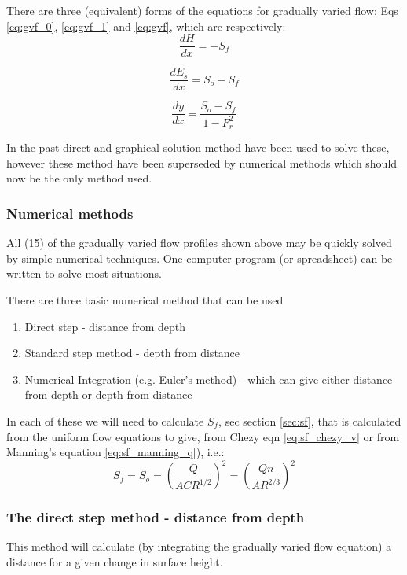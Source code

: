 \documentclass[a4paper, 12pt, british]{article} %
\numberwithin{equation}{section}
\numberwithin{figure}{section}
\numberwithin{table}{section}
\begin{document}
There are three (equivalent) forms of the equations for gradually varied flow: Eqs \ref{eq:gvf_0}, \ref{eq:gvf_1} and \ref{eq:gvf}, which are respectively: 
\begin{equation*}
\frac{dH}{dx} = -S_f
\end{equation*}

\begin{equation*}
\frac{dE_s}{dx} = S_o-S_f
\end{equation*}

\begin{equation*}
\frac{dy}{dx} = \frac{S_o-S_f}{1 - F_r^2}
\end{equation*}  

In the past direct and graphical solution method have been used to solve these, however these method have been superseded by numerical methods which should now be the only method used.

\subsubsection{Numerical methods}

All (15) of the gradually varied flow profiles shown above may be quickly solved by simple numerical techniques. One computer program (or spreadsheet) can be written to solve most situations.

There are three basic numerical method that can be used 

\begin{enumerate}[label=\roman*,noitemsep]
	\item Direct step - distance from depth 
\item Standard step method - depth from distance
\item Numerical Integration (e.g. Euler's method) - which can give either distance from depth or depth from distance
\end{enumerate}

In each of these we will need to calculate $S_f$, sec section \ref{sec:sf}, that is calculated from the uniform flow equations to give, from Chezy eqn \ref{eq:sf_chezy_v} or from Manning's equation  \ref{eq:sf_manning_q}), i.e.:
\begin{equation}
S_f = S_o = \left( \frac{Q}{ACR^{1/2}}\right)^2 =\left( \frac{Q n}{A R^{2/3}}\right)^2 
\label{eq:sf}
\end{equation}

\subsubsection{The direct step method - distance from depth}
This method will calculate (by integrating the gradually varied flow equation) a distance for a given change in surface height.
\end{document}
